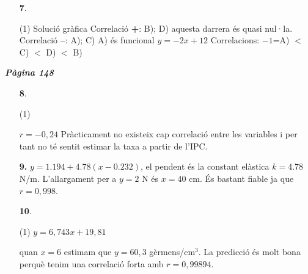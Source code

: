 \documentclass[a4paper, pdf, twoside]{book}
\begin{document}
\begin{multicols}{2}
\begin{enumerate}

 \item[\fontfamily{phv}\selectfont\color{blue}\textbf{7}. ] 
 \begin{tasks}[column-sep=1em, item-indent=1.3333em](1)
	 \task Solució gràfica
	 \task Correlació \textbf {+}: B); D) aquesta darrera és quasi nul·la. Correlació \textbf {--}: A); C)
	 \task A) és funcional $y=-2x+12$
	 \task Correlacions: $-1$=A) $<$ C) $<$ D) $<$ B) 
\end{tasks}
 \end{enumerate}
\vspace{0.3cm}


{\textbf{\em Pàgina 148}} \hrulefill
\begin{enumerate}
\vspace{0.25cm}



 \item[\fontfamily{phv}\selectfont\color{blue}\textbf{8}. ] 
 \begin{tasks}[column-sep=1em, item-indent=1.3333em](1)
	 \task* \mbox {} \par {}
	 \task $r=-0,24$
	 \task* Pràcticament no existeix cap correlació entre les variables i per tant no té sentit estimar la taxa a partir de l'IPC.
\end{tasks}
 \end{enumerate}
\begin{enumerate}
\vspace{0.25cm}
\item[\fontfamily{phv}\selectfont\color{blue}\textbf{9. }]  \scalebox{0.6}{\simbolclau } 
$y=1.194+4.78(x-0.232)$, el pendent és la constant elàstica $k=4.78$ N/m. L'allargament per a $y=2$ N és $x=40$ cm. És bastant fiable ja que $r=0,998$.
\vspace{0.25cm}



 \item[\fontfamily{phv}\selectfont\color{blue}\textbf{10}. ] 
 \begin{tasks}[column-sep=1em, item-indent=1.3333em](1)
	 \task* $y=6,743x+19,81$ \par {}
	 \task* quan $x=6$ estimam que $y=60,3$ gèrmens/cm$^3$. La predicció és molt bona perquè tenim una correlació forta amb $r=0,99894$.
\end{tasks}
 \end{enumerate}
\vspace{0.3cm}


\end{multicols}
\end{document}
